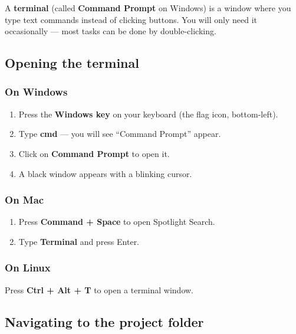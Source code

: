 \documentclass[a4paper,11pt]{article}
\begin{document}
A \textbf{terminal} (called \textbf{Command Prompt} on Windows) is a window where you type text commands instead of clicking buttons. You will only need it occasionally --- most tasks can be done by double-clicking.

\subsection{Opening the terminal}

\subsubsection{On Windows}

\begin{stepbox}
\begin{enumerate}[itemsep=6pt]
  \item Press the \textbf{Windows key} on your keyboard (the flag icon, bottom-left).
  \item Type \textbf{cmd} --- you will see ``Command Prompt'' appear.
  \item Click on \textbf{Command Prompt} to open it.
  \item A black window appears with a blinking cursor.
\end{enumerate}
\end{stepbox}

\subsubsection{On Mac}

\begin{stepbox}
\begin{enumerate}[itemsep=6pt]
  \item Press \textbf{Command + Space} to open Spotlight Search.
  \item Type \textbf{Terminal} and press Enter.
\end{enumerate}
\end{stepbox}

\subsubsection{On Linux}

\begin{stepbox}
Press \textbf{Ctrl + Alt + T} to open a terminal window.
\end{stepbox}

\subsection{Navigating to the project folder}
\end{document}
